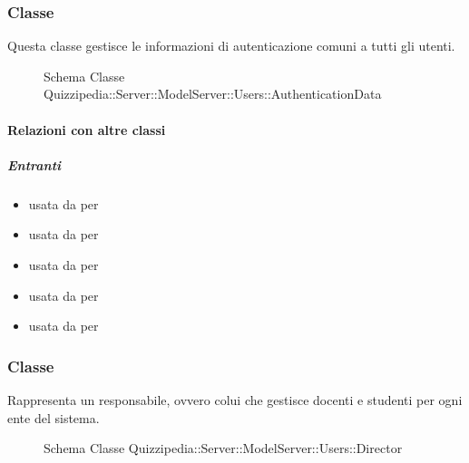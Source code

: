 \subsubsection{Classe }
Questa classe gestisce le informazioni di autenticazione comuni a tutti gli utenti.
\begin{figure}[H]
\centering
\noindent{}
\caption[Schema Classe AuthenticationData]{Schema Classe Quizzipedia::Server::ModelServer::Users::AuthenticationData}
\end{figure}
\paragraph{Relazioni con altre classi}
\subparagraph{Entranti}
\begin{itemize}
\item usata da  per 
\item usata da  per 
\item usata da  per 
\item usata da  per 
\item usata da  per 
\end{itemize}
\subsubsection{Classe }
Rappresenta un responsabile, ovvero colui che gestisce docenti e studenti per ogni ente del sistema.
\begin{figure}[H]
\centering
\noindent{}
\caption[Schema Classe Director]{Schema Classe Quizzipedia::Server::ModelServer::Users::Director}
\end{figure}

